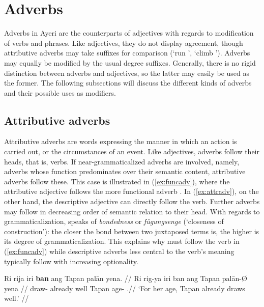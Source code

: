 
\section{Adverbs}
\label{sec:adverbs}

Adverbs in Ayeri are the counterparts of adjectives with regards to
modification of verbs and phrases. Like adjectives, they do not display
agreement, though attributive adverbs may take suffixes for comparison (`run
', `climb '). Adverbs may equally be modified by the
usual degree suffixes. Generally, there is no rigid distinction between adverbs
and adjectives, so the latter may easily be used as the former. The following
subsections will discuss the different kinds of adverbs and their possible uses
as modifiers.

\subsection{Attributive adverbs}

Attributive adverbs are words expressing the manner in which an action is
carried out, or the circumstances of an event. Like adjectives, adverbs follow
their heads, that is, verbs. If near-grammaticalized adverbs are involved,
namely, adverbs whose function predominates over their semantic content,
attributive adverbs follow these. This case is illustrated in
(\ref{ex:funcadv}), where the attributive adjective 
follows the more functional adverb . In
(\ref{ex:attradv}), on the other hand, the descriptive adjective
 can directly follow the verb. Further adverbs may
follow in decreasing order of semantic relation to their head. With regards to
grammaticalization, \citet[157\psqq]{lehmann2015} speaks of \emph{bondedness}
or \emph{fügungsenge} (`closeness of construction'): the closer the bond
between two juxtaposed terms is, the higher is its degree of
grammaticalization. This explains why  must follow the verb in
(\ref{ex:funcadv}) while descriptive adverbs less central to the verb's meaning
typically follow with increasing optionality.

\pex
\a\label{ex:funcadv}\begingl
	\gla Ri rija iri \textbf{ban} ang Tapan palān yena. //
	\glb Ri rig-ya iri ban ang Tapan palān-Ø yena //
	\glc \InsT{} draw-\TsgM{} already well \Aarg{} Tapan age-\Top{} 
		\TsgF{}.\Gen //
	\glft `For her age, Tapan already draws well.' //
\endgl

